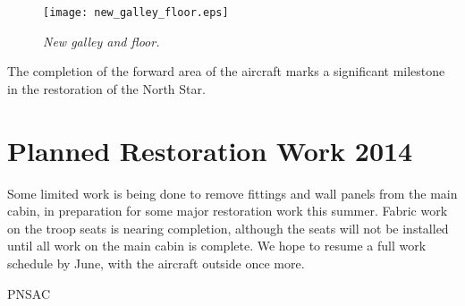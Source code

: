 \begin{figure}[htbp]
   \vspace{2em}
   \centering
   \texttt{[image: new\_galley\_floor.eps]}
   \caption*{\small \em New galley and floor.}
   \label{fig:new_galley_floor}
\end{figure}

The completion of the forward area of the aircraft marks a
significant milestone in the restoration of the North Star.

\section{Planned Restoration Work 2014}
\label{sec:plannedwork}

Some limited work is being done to remove fittings and wall
panels from the main cabin, in preparation for some major
restoration work this summer.  Fabric work on the troop seats is
nearing completion, although the seats will not be installed
until all work on the main cabin is complete.  We hope to resume
a full work schedule by June, with the aircraft outside once
more.

\begin{footnotesize}
  \raggedleft PNSAC\\
\end{footnotesize}



